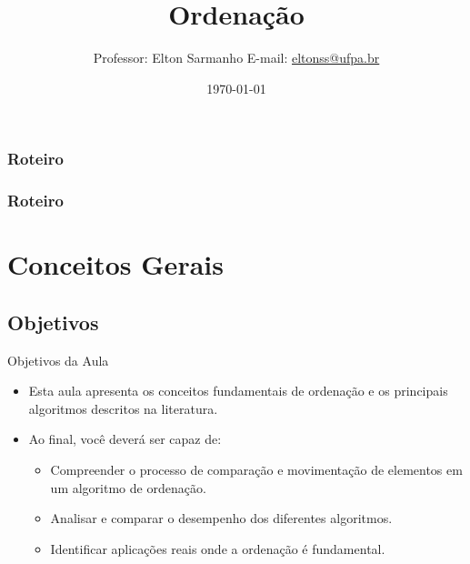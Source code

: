 \documentclass{beamer}
\title[Estrutura de Dados I]{Ordenação}
\author[Elton Sarmanho]{
Professor: Elton Sarmanho\inst{1}
\newline
E-mail: \href{mailto:eltonss@ufpa.br}{eltonss@ufpa.br}\newline
\href{https://github.com/eltonsarmanho}{\faGithub} \href{https://www.linkedin.com/in/elton-sarmanho-836553185/}{\faLinkedinSquare}
}
\institute[UFPA]{
   \inst{1}%
     Faculdade de Sistemas de Informação - UFPA/CUTINS
     }
\date{\today}
\begin{document}
\begin{frame}
\titlepage
\end{frame}

\begin{frame}
\frametitle{Roteiro}
\tableofcontents[sections={1-2}]
\end{frame}

\begin{frame}
\frametitle{Roteiro}
\tableofcontents[sections={3-4}]
\end{frame}

\section{Conceitos Gerais}
\subsection{Objetivos}
\begin{frame}{Objetivos da Aula}
\begin{itemize}
 \item Esta aula apresenta os conceitos fundamentais de ordenação e os principais algoritmos descritos na literatura.
 \item Ao final, você deverá ser capaz de:
 \begin{itemize}
  \item Compreender o processo de comparação e movimentação de elementos em um algoritmo de ordenação.
  \item Analisar e comparar o desempenho dos diferentes algoritmos.
  \item Identificar aplicações reais onde a ordenação é fundamental.
 \end{itemize}
\end{itemize}
\end{frame}
\end{document}
